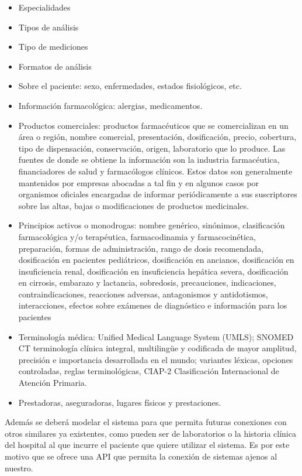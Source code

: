     \begin{itemize}
        \item Especialidades
        \item Tipos de  análisis
        \item Tipo de mediciones 
        \item Formatos de análisis
        \item Sobre el paciente: sexo, enfermedades, estados fisiológicos, etc.
        \item Información farmacológica: alergias, medicamentos.
        \item Productos comerciales: productos farmacéuticos que se comercializan en un área o región, nombre comercial, presentación, dosificación, precio, cobertura, tipo de dispensación, conservación, origen, laboratorio que lo produce. Las fuentes de donde se obtiene la información son la industria farmacéutica, financiadores de salud y farmacólogos clínicos. Estos datos son generalmente mantenidos por empresas abocadas a tal fin y en algunos casos por organismos oficiales encargadas de informar periódicamente a sus suscriptores sobre las altas, bajas o modificaciones de productos medicinales.
        \item Principios activos o monodrogas: nombre genérico, sinónimos, clasificación farmacológica y/o terapéutica, farmacodinamia y farmacocinética, preparación, formas de administración, rango de dosis recomendada, dosificación en pacientes pediátricos, dosificación en ancianos, dosificación en insuficiencia renal, dosificación en insuficiencia hepática severa, dosificación en cirrosis, embarazo y lactancia, sobredosis, precauciones, indicaciones, contraindicaciones, reacciones adversas, antagonismos y antidotismos, interacciones, efectos sobre exámenes de diagnóstico e información para los pacientes
        \item Terminología médica: Unified Medical Language System (UMLS); SNOMED CT  terminología clínica integral, multilingüe y codificada de mayor amplitud, precisión e importancia desarrollada en el mundo; variantes léxicas, opciones controladas, reglas terminológicas, CIAP-2 Clasificación Internacional de Atención Primaria.
        \item Prestadoras, aseguradoras, lugares físicos y prestaciones.
	\end{itemize} 
    
Además se deberá modelar el sistema para que permita futuras conexiones con otros similares ya existentes, como pueden ser de laboratorios o la historia clínica del hospital al que incurre el paciente que quiere utilizar el sistema. Es por este motivo que se ofrece una API que permita la conexión de sistemas ajenos al nuestro.


